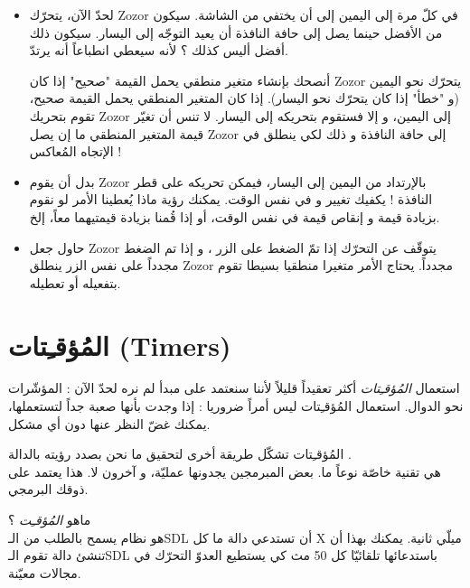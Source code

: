 \begin{itemize}
	\item  لحدّ الآن، يتحرّك 
	\textenglish{Zozor}
	في كلّ مرة إلى اليمين إلى أن يختفي من الشاشة. سيكون من الأفضل حينما يصل إلى حافة النافذة أن يعيد التوجّه إلى اليسار. سيكون ذلك أفضل أليس كذلك ؟ لأنه سيعطي انطباعاً أنه يرتدّ.
	
	أنصحك بإنشاء متغير منطقي
	يحمل القيمة "صحيح" إذا كان 
	\textenglish{Zozor}
	يتحرّك نحو اليمين (و "خطأ" إذا كان يتحرّك نحو اليسار). إذا كان المتغير المنطقي يحمل القيمة صحيح، تقوم بتحريك
	\textenglish{Zozor}
	إلى اليمين، و إلا فستقوم بتحريكه إلى اليسار. لا تنس أن تغيّر قيمة المتغير المنطقي ما إن يصل
	\textenglish{Zozor}
	إلى حافة النافذة و ذلك لكي ينطلق في الإتجاه المُعاكس !
	\item بدل أن يقوم 
	\textenglish{Zozor} 
	بالإرتداد من اليمين إلى اليسار، فيمكن تحريكه على قطر النافذة ! يكفيك تغيير 
	و 
	في نفس الوقت. يمكنك رؤية ماذا يُعطينا الأمر لو نقوم بزيادة قيمة 
	و إنقاص قيمة 
	في نفس الوقت، أو إذا قُمنا بزيادة قيمتيهما معاً، إلخ.
	\item حاول جعل
	\textenglish{Zozor}
	يتوقّف عن التحرّك إذا تمّ الضغط على الزر
	،
	و إذا تم الضغط مجدداً على نفس الزر ينطلق
	\textenglish{Zozor}
	مجدداً. يحتاج الأمر متغيرا منطقيا بسيطا تقوم بتفعيله أو تعطيله.
\end{itemize}

\section{المُؤقـِتات (\textenglish{Timers})}

\begin{warning}
استعمال 
\textit{المُؤقـِتات}
أكثر تعقيداً قليلاً لأننا سنعتمد على مبدأ لم نره لحدّ الآن : المؤشّرات نحو الدوال. استعمال المُؤقـِتات ليس أمراً ضروريا : إذا وجدت بأنها صعبة جداً لتستعملها، يمكنك غضّ النظر عنها دون أي مشكل.
\end{warning}

المُؤقـِتات تشكّل طريقة أخرى لتحقيق ما نحن بصدد رؤيته بالدالة 
.\\
هي تقنية خاصّة نوعاً ما. بعض المبرمجين يجدونها عمليّة، و آخرون لا. هذا يعتمد على ذوقك البرمجي.

ماهو 
\textit{المُؤقـِت} ؟\\
هو نظام يسمح بالطلب من الـ\textenglish{SDL}
أن تستدعي دالة ما كل 
\textenglish{X}
ميلّي ثانية. يمكنك بهذا أن تنشئ دالة 
تقوم الـ\textenglish{SDL}
باستدعائها تلقائيّا كل 50 مث كي يستطيع العدوّ التحرّك في مجالات معيّنة.

